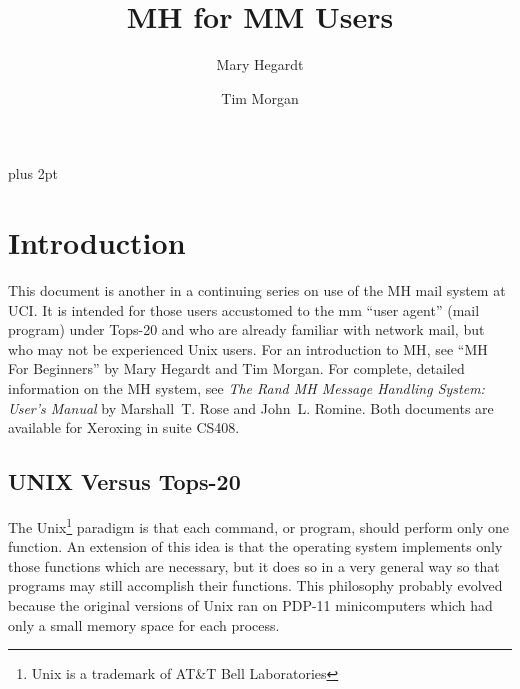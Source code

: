 \parindent=0pt
\parskip=7pt plus 2pt

\def\oneline#1{\par\bigskip\leftline{\tt\hskip.75in#1}}
\def\command#1{\par\bigskip\leftline{\tt\hskip.75in\% #1}}
\def\comarg#1#2{\par\bigskip\leftline{\tt\hskip.75in\% #1 {\it#2}}}
\def\tcom#1{\par\bigskip\leftline{\tt\hskip.75in@#1}}
\def\MH/{{\sf MH}}
\def\tops20/{{\sc Tops-20}}
\def\unix/{{\sc Unix}}
\def\MM/{{\sc mm}}
\sloppy


\title{MH for MM Users}
\author{Mary Hegardt \and Tim Morgan}
\maketitle

\section{Introduction}

This document is another in a continuing series on use of the \MH/ mail
system at UCI.  It is intended for those users accustomed to the \MM/ ``user
agent'' (mail program) under \tops20/ and who are already familiar with
network mail, but who may not be experienced \unix/ users.  For an
introduction to \MH/, see ``MH For Beginners'' by Mary
Hegardt and Tim Morgan.  For complete, detailed information on the \MH/
system, see {\sl The Rand MH Message Handling System: User's Manual\/} by
Marshall~T. Rose and John~L. Romine. Both documents are available for
Xeroxing in suite CS408.

\subsection{UNIX Versus Tops-20}

The \unix/\footnote{\unix/ is a trademark of AT\&T Bell Laboratories}
paradigm is that each command, or program, should perform only one
function.  An extension of this idea is that the operating system
implements only those functions which are necessary, but it does so in
a very general way so that programs may still accomplish their functions.
This philosophy probably evolved because the original versions
of \unix/ ran on PDP-11 minicomputers which had only a small memory
space for each process.

